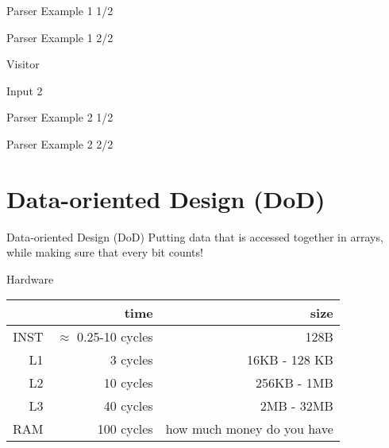 \documentclass[aspectratio=169,notes]{beamer}
\begin{document}
	\begin{frame}[fragile]{Parser Example 1 1/2}
		
	\end{frame}

	\begin{frame}[fragile]{Parser Example 1 2/2}
		
	\end{frame}

	\begin{frame}[fragile]{Visitor}
		
	\end{frame}

	\begin{frame}[fragile]{Input 2}
		
	\end{frame}

	\begin{frame}[fragile]{Parser Example 2 1/2}
		
	\end{frame}

	\begin{frame}[fragile]{Parser Example 2 2/2}
		
	\end{frame}

	\section{Data-oriented Design (DoD)}

	\begin{frame}[fragile]{Data-oriented Design (DoD)}
		\large
		\centering Putting data that is accessed together in arrays, while
			making sure that every bit counts!
	\end{frame}

	\begin{frame}[fragile]{Hardware}
		\centering
		\begin{tabular}{r r r}
				& time & size \\ \hline
		   INST & $\approx{}$ 0.25-10 cycles & 128B \\
\pause
			L1 & 3 cycles & 16KB - 128 KB \\
			L2 & 10 cycles & 256KB - 1MB \\
			L3 & 40 cycles & 2MB - 32MB \\
		   RAM & 100 cycles & how much money do you have
		\end{tabular}

	\end{frame}
\end{document}
